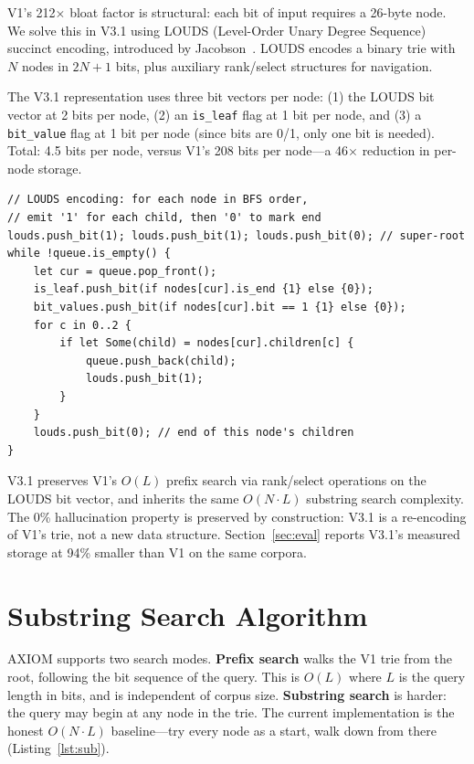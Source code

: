 \documentclass[conference]{IEEEtran}
\begin{document}
V1's 212$\times$ bloat factor is structural: each bit of input requires a 26-byte node. We solve this in V3.1 using LOUDS (Level-Order Unary Degree Sequence) succinct encoding, introduced by Jacobson~\cite{jacobson1989louds}. LOUDS encodes a binary trie with $N$ nodes in $2N+1$ bits, plus auxiliary rank/select structures for navigation.

The V3.1 representation uses three bit vectors per node: (1) the LOUDS bit vector at 2 bits per node, (2) an \texttt{is\_leaf} flag at 1 bit per node, and (3) a \texttt{bit\_value} flag at 1 bit per node (since bits are 0/1, only one bit is needed). Total: 4.5 bits per node, versus V1's 208 bits per node---a 46$\times$ reduction in per-node storage.

\begin{lstlisting}[caption={V3.1 LOUDS construction: BFS the trie, emit degree in unary.},label={lst:v31}]
// LOUDS encoding: for each node in BFS order,
// emit '1' for each child, then '0' to mark end
louds.push_bit(1); louds.push_bit(1); louds.push_bit(0); // super-root
while !queue.is_empty() {
    let cur = queue.pop_front();
    is_leaf.push_bit(if nodes[cur].is_end {1} else {0});
    bit_values.push_bit(if nodes[cur].bit == 1 {1} else {0});
    for c in 0..2 {
        if let Some(child) = nodes[cur].children[c] {
            queue.push_back(child);
            louds.push_bit(1);
        }
    }
    louds.push_bit(0); // end of this node's children
}
\end{lstlisting}

V3.1 preserves V1's $O(L)$ prefix search via rank/select operations on the LOUDS bit vector, and inherits the same $O(N{\cdot}L)$ substring search complexity. The 0\% hallucination property is preserved by construction: V3.1 is a re-encoding of V1's trie, not a new data structure. Section~\ref{sec:eval} reports V3.1's measured storage at 94\% smaller than V1 on the same corpora.

\section{Substring Search Algorithm}

AXIOM supports two search modes. \textbf{Prefix search} walks the V1 trie from the root, following the bit sequence of the query. This is $O(L)$ where $L$ is the query length in bits, and is independent of corpus size. \textbf{Substring search} is harder: the query may begin at any node in the trie. The current implementation is the honest $O(N{\cdot}L)$ baseline---try every node as a start, walk down from there (Listing~\ref{lst:sub}).
\end{document}
